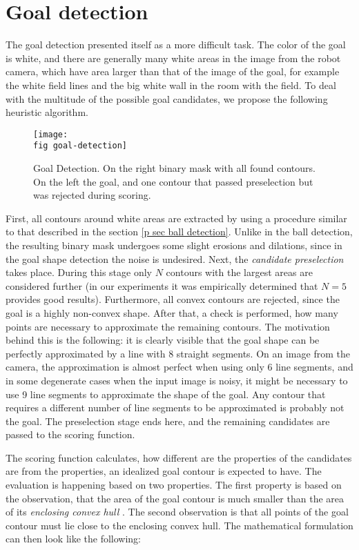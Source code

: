 \section{Goal detection}
\label{p sec goal detect}

The goal detection presented itself as a more difficult task. The color of the
goal is white, and there are generally many white areas in the image from the
robot camera, which have area larger than that of the image of the goal, for
example the white field lines and the big white wall in the room with the
field. To deal with the multitude of the possible goal candidates, we
propose the following heuristic algorithm.

\begin{figure}[ht]
  \texttt{[image: \\fig goal-detection]}
  \caption{Goal Detection. On the right binary mask with all found contours. On
    the left the goal, and one contour that passed preselection but was
    rejected during scoring.}
  \label{p figure goal-detection}
\end{figure}

First, all contours around white areas are extracted by using a procedure
similar to that described in the section \ref{p sec ball detection}. Unlike in
the ball detection, the resulting binary mask undergoes some slight erosions
and dilations, since in the goal shape detection the noise is undesired. Next,
the \textit{candidate preselection} takes place. During this stage only $N$
contours with the largest areas are considered further (in our experiments it
was empirically determined that $N=5$ provides good results). Furthermore, all
convex contours are rejected, since the goal is a highly non-convex shape.
After that, a check is performed, how many points are necessary to approximate
the remaining contours. The motivation behind this is the following: it is
clearly visible that the goal shape can be perfectly approximated by a line
with 8 straight segments. On an image from the camera, the approximation is
almost perfect when using only 6 line segments, and in some degenerate cases
when the input image is noisy, it might be necessary to use 9 line segments to
approximate the shape of the goal. Any contour that requires a different number
of line segments to be approximated is probably not the goal. The preselection
stage ends here, and the remaining candidates are passed to the scoring
function.

The scoring function calculates, how different are the properties of the
candidates are from the properties, an idealized goal contour is expected to
have. The evaluation is happening based on two properties. The first property
is based on the observation, that the area of the goal contour is much smaller
than the area of its \textit{enclosing convex hull} \cite{convex-hull}. The
second observation is that all points of the goal contour must lie close to the
enclosing convex hull. The mathematical formulation can then look like the
following:

